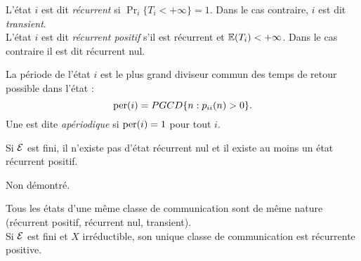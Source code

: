 \begin{definition}
  L'état $i$ est dit {\em récurrent} si $\Pr_i\{T_i < + \infty\} = 1$. Dans le cas contraire, $i$ est dit {\em transient}. \\
  L'état $i$ est dit {\em récurrent positif} s'il est récurrent et $\operatorname{\mathbb{E}}(T_i) < + \infty$. Dans le cas contraire il est dit récurrent nul.
\end{definition}


\begin{definition}
  La période de l'état $i$ est le plus grand diviseur commun des temps de retour possible dans l'état :
  $$
  \text{per}(i) = PGCD\{n: p_{ii}(n) > 0\}.
  $$
  Une \cM est dite {\em apériodique} si $\text{per}(i) = 1$ pour tout $i$.
\end{definition}


\begin{proposition}
  Si $\mathcal{E}$ est fini, il n'existe pas d'état récurrent nul et il existe au moins un état récurrent positif.
\end{proposition}

\proof Non démontré. \eproof

\begin{proposition}
  Tous les états d'une même classe de communication sont de même nature (récurrent positif, récurrent nul, transient). \\
  Si $\mathcal{E}$ est fini et $X$ irréductible, son unique classe de communication est récurrente positive.
\end{proposition}

